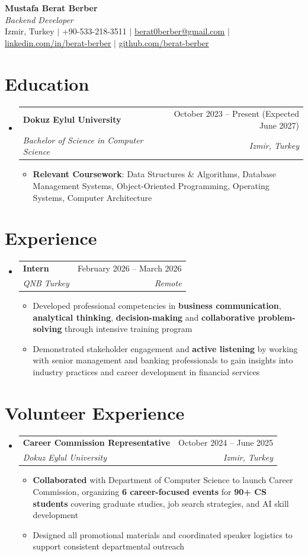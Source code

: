 \documentclass[letterpaper,11pt]{article}
\makeatletter
\newcommand{\resumeItem}[1]{
  \item\small{
    {#1 \vspace{-2pt}}
  }
}
\newcommand{\resumeSubheading}[4]{
  \vspace{-2pt}\item
    \begin{tabular*}{0.97\textwidth}[t]{l@{\extracolsep{\fill}}r}
      \textbf{#1} & #2 \\
      \textit{\small#3} & \textit{\small #4} \\
    \end{tabular*}\vspace{-7pt}
}
\newcommand{\resumeSubHeadingListStart}{\begin{itemize}[leftmargin=0.15in, label={}]}
\newcommand{\resumeSubHeadingListEnd}{\end{itemize}}
\newcommand{\resumeItemListStart}{\begin{itemize}}
\newcommand{\resumeItemListEnd}{\end{itemize}\vspace{-5pt}}
\makeatother
\begin{document}
\begin{center}
    \textbf{\Huge Mustafa Berat Berber} \\ \vspace{5pt}
    \textit{\Large Backend Developer} \\ \vspace{10pt}
    \small Izmir, Turkey $|$
    +90-533-218-3511 $|$ \href{mailto:berat0berber@gmail.com}{\underline{berat0berber@gmail.com}} $|$ 
    \href{https://linkedin.com/in/berat-berber}{\underline{linkedin.com/in/berat-berber}} $|$
    \href{https://github.com/berat-berber}{\underline{github.com/berat-berber}}
\end{center}


\section{Education}
  \resumeSubHeadingListStart
    \resumeSubheading
      {Dokuz Eylul University}{October 2023 -- Present (Expected June 2027)}
      {Bachelor of Science in Computer Science}
      {Izmir, Turkey}
      \resumeItemListStart
      \resumeItem{\textbf{Relevant Coursework}: Data Structures \& Algorithms, Database Management Systems, Object-Oriented Programming, Operating Systems, Computer Architecture}
    \resumeItemListEnd
  \resumeSubHeadingListEnd

\section{Experience}
  \resumeSubHeadingListStart
    \resumeSubheading
      {Intern}{February 2026 -- March 2026}
      {QNB Turkey}{Remote}
      \resumeItemListStart
        \resumeItem{Developed professional competencies in \textbf{business communication}, \textbf{analytical thinking}, \textbf{decision-making} and \textbf{collaborative problem-solving} through intensive training program}
        \resumeItem{Demonstrated stakeholder engagement and \textbf{active listening} by working with senior management and banking professionals to gain insights into industry practices and career development in financial services}
      \resumeItemListEnd
    \resumeSubHeadingListEnd

\section{Volunteer Experience}
  \resumeSubHeadingListStart
    \resumeSubheading
      {Career Commission Representative}{October 2024 -- June 2025}
      {Dokuz Eylul University}{Izmir, Turkey}
      \resumeItemListStart
        \resumeItem{\textbf{Collaborated} with Department of Computer Science to launch Career Commission, organizing \textbf{6 career-focused events} for \textbf{90+ CS students} covering graduate studies, job search strategies, and AI skill development}
        \resumeItem{Designed all promotional materials and coordinated speaker logistics to support consistent departmental outreach}
      \resumeItemListEnd
    \resumeSubHeadingListEnd
      
\end{document}
